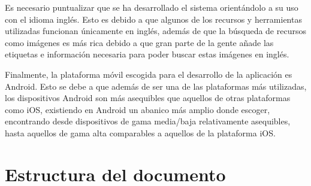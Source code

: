 Es necesario puntualizar que se ha desarrollado el sistema orientándolo a su uso con el idioma inglés. Esto es debido a que algunos de los recursos y herramientas utilizadas funcionan únicamente en inglés, además de que la búsqueda de recursos como imágenes es más rica debido a que gran parte de la gente añade las etiquetas e información necesaria para poder buscar estas imágenes en inglés.

Finalmente, la plataforma móvil escogida para el desarrollo de la aplicación es Android. Esto se debe a que además de ser una de las plataformas más utilizadas, los dispositivos Android son más asequibles que aquellos de otras plataformas como iOS, existiendo en Android un abanico más amplio donde escoger, encontrando desde dispositivos de gama media/baja relativamente asequibles, hasta aquellos de gama alta comparables a aquellos de la plataforma iOS.

\section{Estructura del documento}

